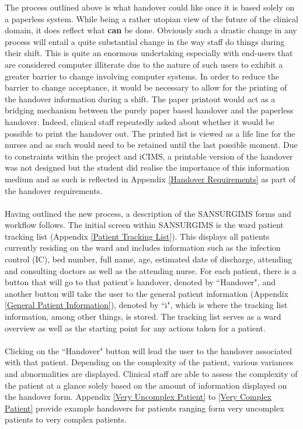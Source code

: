 \newpage
\noindent The process outlined above is what handover could like once it is based solely on a paperless system. While being a rather utopian view of the future of the clinical domain, it does reflect what \textbf{can} be done. Obviously such a drastic change in any process will entail a quite substantial change in the way staff do things during their shift. This is quite an enormous undertaking especially with end-users that are considered computer illiterate due to the nature of such users to exhibit a greater barrier to change involving computer systems. In order to reduce the barrier to change acceptance, it would be necessary to allow for the printing of the handover information during a shift. The paper printout would act as a bridging mechanism between the purely paper based handover and the paperless handover. Indeed, clinical staff repeatedly asked about whether it would be possible to print the handover out. The printed list is viewed as a life line for the nurses and as such would need to be retained until the last possible moment. Due to constraints within the project and iCIMS, a printable version of the handover was not designed but the student did realise the importance of this information medium and as such is reflected in Appendix \ref{Handover Requirements} as part of the handover requirements.
\\ \\
Having outlined the new process, a description of the SANSURGIMS forms and workflow follows. The initial screen within SANSURGIMS is the ward patient tracking list (Appendix \ref{Patient Tracking List}). This displays all patients currently residing on the ward and includes information such as the infection control (IC), bed number, full name, age, estimated date of discharge, attending and consulting doctors as well as the attending nurse. For each patient, there is a button that will go to that patient's handover, denoted by ``Handover", and another button will take the user to the general patient information (Appendix \ref{General Patient Information}), denoted by ``i", which is where the tracking list information, among other things, is stored. The tracking list serves as a ward overview as well as the starting point for any actions taken for a patient.
\\ \\
Clicking on the ``Handover" button will lead the user to the handover associated with that patient. Depending on the complexity of the patient, various variances and abnormalities are displayed. Clinical staff are able to assess the complexity of the patient at a glance solely based on the amount of information displayed on the handover form. Appendix \ref{Very Uncomplex Patient} to \ref{Very Complex Patient} provide example handovers for patients ranging form very uncomplex patients to very complex patients. 


